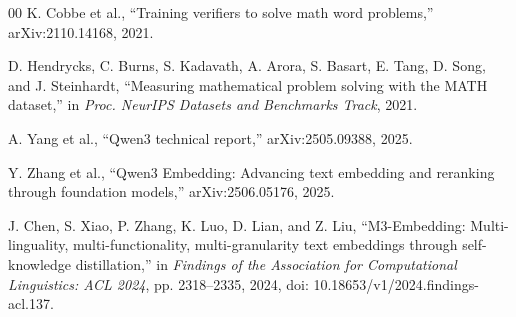 \documentclass[conference]{IEEEtran}
\begin{document}
\begin{thebibliography}{00}
K. Cobbe et al., ``Training verifiers to solve math word problems,''
arXiv:2110.14168, 2021.

D. Hendrycks, C. Burns, S. Kadavath, A. Arora, S. Basart, E. Tang, D. Song,
and J. Steinhardt, ``Measuring mathematical problem solving with the MATH
dataset,'' in \emph{Proc. NeurIPS Datasets and Benchmarks Track}, 2021.

A. Yang et al., ``Qwen3 technical report,'' arXiv:2505.09388, 2025.

Y. Zhang et al., ``Qwen3 Embedding: Advancing text embedding and reranking
through foundation models,'' arXiv:2506.05176, 2025.

J. Chen, S. Xiao, P. Zhang, K. Luo, D. Lian, and Z. Liu, ``M3-Embedding:
Multi-linguality, multi-functionality, multi-granularity text embeddings
through self-knowledge distillation,'' in \emph{Findings of the Association
for Computational Linguistics: ACL 2024}, pp. 2318--2335, 2024,
doi: 10.18653/v1/2024.findings-acl.137.
\end{thebibliography}
\end{document}
